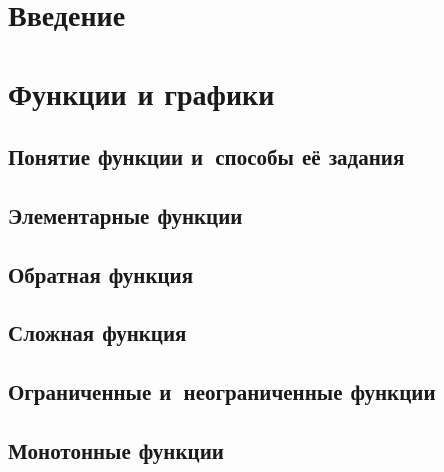 \documentclass[14pt, oneside]{extbook}
\begin{document}
\chapter*{Введение}


\chapter{Функции и графики}
\section{Понятие функции и~способы её задания}

\section{Элементарные функции}

\section{Обратная функция}

\section{Сложная функция}

\section{Ограниченные и~неограниченные функции}

\section{Монотонные функции}

\end{document}
